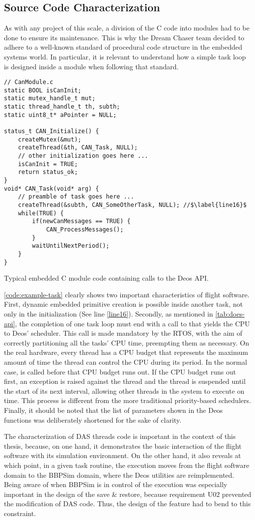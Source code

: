 {\subsection*{Source Code Characterization}
As with any project of this scale, a division of the C code into modules had to be done to ensure its maintenance. This is why the Dream Chaser team decided to adhere to a well-known standard of procedural code structure in the embedded systems world. In particular, it is relevant to understand how a simple task loop is designed inside a module when following that standard. 
\begin{listing}[H]
	\begin{verbatim}
// CanModule.c
static BOOL isCanInit;
static mutex_handle_t mut;
static thread_handle_t th, subth;
static uint8_t* aPointer = NULL;

status_t CAN_Initialize() {
	createMutex(&mut);
	createThread(&th, CAN_Task, NULL);
	// other initialization goes here ...
	isCanInit = TRUE;
	return status_ok;
}
void* CAN_Task(void* arg) {
	// preamble of task goes here ...
	createThread(&subth, CAN_SomeOtherTask, NULL); //$\label{line16}$
	while(TRUE) {
		if(newCanMessages == TRUE) {
			CAN_ProcessMessages();
		}
		waitUntilNextPeriod();
	}
}
	\end{verbatim}
	\caption{Typical embedded C module code containing calls to the Deos API.}
	\label{code:example-task}
\end{listing}

\autoref{code:example-task} clearly shows two important characteristics of flight software. First, dynamic embedded primitive creation is possible inside another task, not only in the initialization (See line \ref{line16}). Secondly, as mentioned in \autoref{tab:does-api}, the completion of one task loop must end with a call to  that yields the CPU to Deos' scheduler. This call is made mandatory by the RTOS, with the aim of correctly partitioning all the tasks' CPU time, preempting them as necessary. On the real hardware, every thread has a CPU budget that represents the maximum amount of time the thread can control the CPU during its period. In the normal case,  is called before that CPU budget runs out. If the CPU budget runs out first, an exception is raised against the thread and the thread is suspended until the start of its next interval, allowing other threads in the system to execute on time. This process is different from the more traditional priority-based schedulers. Finally, it should be noted that the list of parameters shown in the Deos functions was deliberately shortened for the sake of clarity. 

The characterization of DAS threads code is important in the context of this thesis, because, on one hand, it demonstrates the basic interaction of the flight software with its simulation environment. On the other hand, it also reveals at which point, in a given task routine, the execution moves from the flight software domain to the BBPSim domain, where the Deos utilities are reimplemented. Being aware of when BBPSim is in control of the execution was especially important in the design of the save \& restore, because requirement U02 prevented the modification of DAS code. Thus, the design of the feature had to bend to this constraint.
}